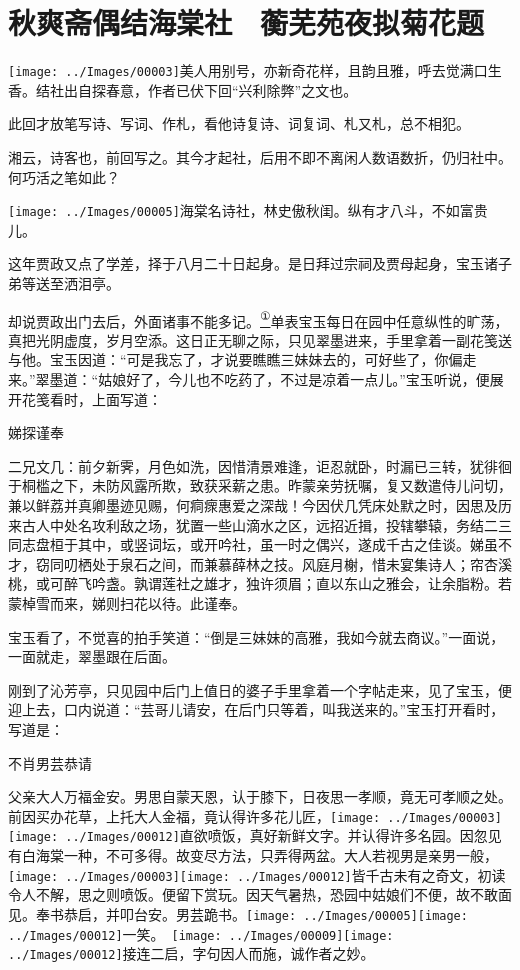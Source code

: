 

\chapter{秋爽斋偶结海棠社　蘅芜苑夜拟菊花题}\label{part0041_split_000.htmlux5cux23calibre_pb_0}

{\texttt{[image: ../Images/00003]}美人用别号，亦新奇花样，且韵且雅，呼去觉满口生香。结社出自探春意，作者已伏下回``兴利除弊''之文也。}

{此回才放笔写诗、写词、作札，看他诗复诗、词复词、札又札，总不相犯。}

{湘云，诗客也，前回写之。其今才起社，后用不即不离闲人数语数折，仍归社中。何巧活之笔如此？}

{\texttt{[image: ../Images/00005]}海棠名诗社，林史傲秋闺。纵有才八斗，不如富贵儿。}

这年贾政又点了学差，择于八月二十日起身。是日拜过宗祠及贾母起身，宝玉诸子弟等送至洒泪亭。

却说贾政出门去后，外面诸事不能多记。\href{../Text/part0041_split_000.html\#lnkback_1_a}{\textsuperscript{①}}单表宝玉每日在园中任意纵性的旷荡，真把光阴虚度，岁月空添。这日正无聊之际，只见翠墨进来，手里拿着一副花笺送与他。宝玉因道：``可是我忘了，才说要瞧瞧三妹妹去的，可好些了，你偏走来。''翠墨道：``姑娘好了，今儿也不吃药了，不过是凉着一点儿。''宝玉听说，便展开花笺看时，上面写道：

娣探谨奉

二兄文几：前夕新霁，月色如洗，因惜清景难逢，讵忍就卧，时漏已三转，犹徘徊于桐槛之下，未防风露所欺，致获采薪之患。昨蒙亲劳抚嘱，复又数遣侍儿问切，兼以鲜荔并真卿墨迹见赐，何痌瘝惠爱之深哉！今因伏几凭床处默之时，因思及历来古人中处名攻利敌之场，犹置一些山滴水之区，远招近揖，投辖攀辕，务结二三同志盘桓于其中，或竖词坛，或开吟社，虽一时之偶兴，遂成千古之佳谈。娣虽不才，窃同叨栖处于泉石之间，而兼慕薛林之技。风庭月榭，惜未宴集诗人；帘杏溪桃，或可醉飞吟盏。孰谓莲社之雄才，独许须眉；直以东山之雅会，让余脂粉。若蒙棹雪而来，娣则扫花以待。此谨奉。

宝玉看了，不觉喜的拍手笑道：``倒是三妹妹的高雅，我如今就去商议。''一面说，一面就走，翠墨跟在后面。

刚到了沁芳亭，只见园中后门上值日的婆子手里拿着一个字帖走来，见了宝玉，便迎上去，口内说道：``芸哥儿请安，在后门只等着，叫我送来的。''宝玉打开看时，写道是：

不肖男芸恭请

父亲大人万福金安。男思自蒙天恩，认于膝下，日夜思一孝顺，竟无可孝顺之处。前因买办花草，上托大人金福，竟认得许多花儿匠，{\texttt{[image: ../Images/00003]}\texttt{[image: ../Images/00012]}\footnotesize \kaishu 直欲喷饭，真好新鲜文字。}并认得许多名园。因忽见有白海棠一种，不可多得。故变尽方法，只弄得两盆。大人若视男是亲男一般，{\texttt{[image: ../Images/00003]}\texttt{[image: ../Images/00012]}\footnotesize \kaishu 皆千古未有之奇文，初读令人不解，思之则喷饭。}便留下赏玩。因天气暑热，恐园中姑娘们不便，故不敢面见。奉书恭启，并叩台安。男芸跪书。{\texttt{[image: ../Images/00005]}\texttt{[image: ../Images/00012]}\footnotesize \kaishu 一笑。　\texttt{[image: ../Images/00009]}\texttt{[image: ../Images/00012]}\footnotesize \kaishu 接连二启，字句因人而施，诚作者之妙。}

